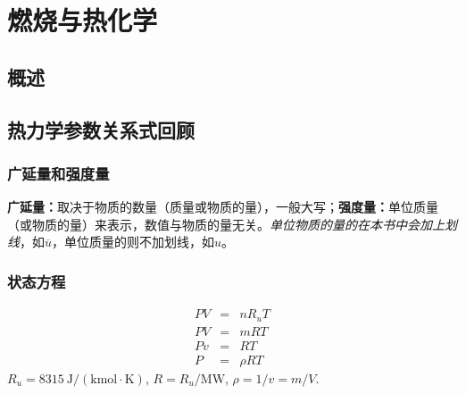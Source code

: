 \section{燃烧与热化学}
\subsection{概述}
\subsection{热力学参数关系式回顾}
\subsubsection{广延量和强度量}
\textbf{广延量：}取决于物质的数量（质量或物质的量），一般大写；{\textbf{强度量：}单位质量（或物质的量）来表示}，数值与物质的量无关。\textit{单位物质的量的在本书中会加上划线}，如$\overline{u}$，单位质量的则不加划线，如$u$。

\subsubsection{状态方程}
\begin{eqnarray}
    PV&=&nR_uT\\
    PV&=&mRT\\
    Pv&=&RT\\
    P&=&\rho RT
\end{eqnarray}
$R_u=8315~\mathrm{J/(kmol\cdot K)}$, $R=R_u/\mathrm{MW}$, $\rho=1/v=m/V$.

